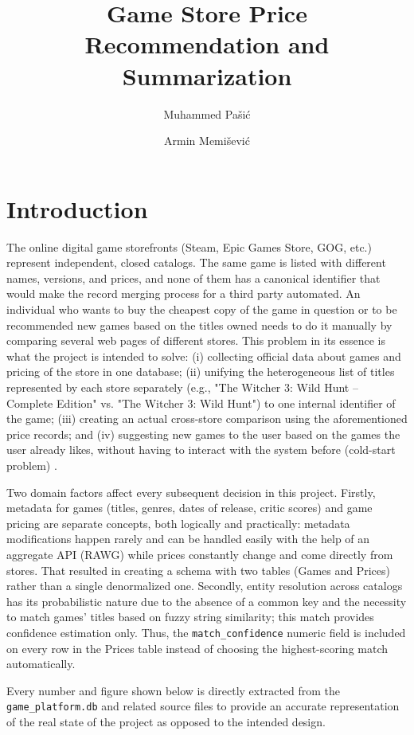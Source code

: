\documentclass[fleqn,10pt]{wlscirep}
\title{Game Store Price Recommendation and Summarization}
\author[1,*]{Muhammed Pašić}
\author[1,+]{Armin Memišević}
\affil[1]{Data Engineering and Machine Learning Project, supervised by Prof.\ Aida Brankovi\'{c}}
\affil[*]{Data Engineering (CDA) lead: database design, API/data acquisition, cleaning, fuzzy matching, price summarization}
\affil[+]{Machine Learning (MLPR) lead: feature engineering, k-Nearest Neighbour recommender, evaluation, Streamlit application}
\begin{document}
\flushbottom
\maketitle
\thispagestyle{empty}

\section*{Introduction}

The online digital game storefronts (Steam, Epic Games Store, GOG, etc.) represent independent, closed catalogs. The same game is listed with different names, versions, and prices, and none of them has a canonical identifier that would make the record merging process for a third party automated. An individual who wants to buy the cheapest copy of the game in question or to be recommended new games based on the titles owned needs to do it manually by comparing several web pages of different stores. This problem in its essence is what the project is intended to solve: (i) collecting official data about games and pricing of the store in one database; (ii) unifying the heterogeneous list of titles represented by each store separately (e.g., "The Witcher 3: Wild Hunt -- Complete Edition" vs. "The Witcher 3: Wild Hunt") to one internal identifier of the game; (iii) creating an actual cross-store comparison using the aforementioned price records; and (iv) suggesting new games to the user based on the games the user already likes, without having to interact with the system before (cold-start problem) \cite{Zhang:coldstart:2025}.

Two domain factors affect every subsequent decision in this project. Firstly, metadata for games (titles, genres, dates of release, critic scores) and game pricing are separate concepts, both logically and practically: metadata modifications happen rarely and can be handled easily with the help of an aggregate API (RAWG) while prices constantly change and come directly from stores. That resulted in creating a schema with two tables (Games and Prices) rather than a single denormalized one. Secondly, entity resolution across catalogs has its probabilistic nature due to the absence of a common key and the necessity to match games' titles based on fuzzy string similarity; this match provides confidence estimation only. Thus, the \texttt{match\_confidence} numeric field is included on every row in the Prices table instead of choosing the highest-scoring match automatically.

Every number and figure shown below is directly extracted from the \texttt{game\_platform.db} and related source files to provide an accurate representation of the real state of the project as opposed to the intended design.
\end{document}
